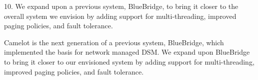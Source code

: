 \ac{10. We expand upon a previous system, BlueBridge, to bring it closer to
the overall system we envision by adding support for multi-threading, improved
paging policies, and fault tolerance.}

Camelot is the next generation of a previous system, BlueBridge, which
implemented the basis for network managed DSM. We expand upon BlueBridge to
bring it closer to our envisioned system by adding support for multi-threading,
improved paging policies, and fault tolerance.


